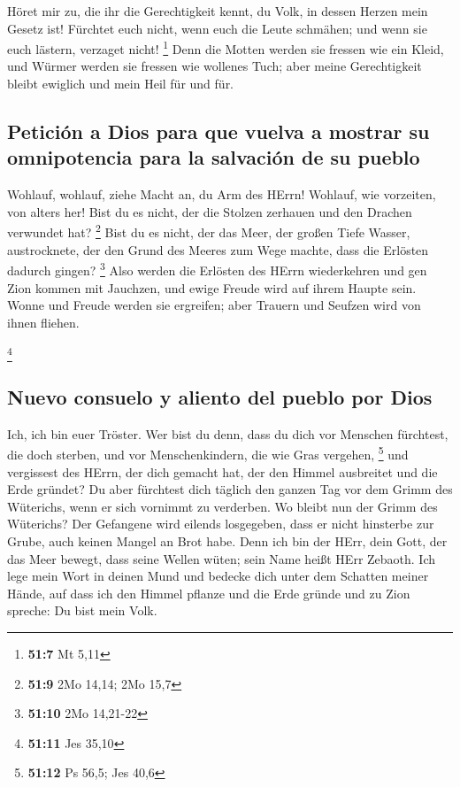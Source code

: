  Höret mir zu, die ihr die Gerechtigkeit kennt, du Volk,
in dessen Herzen mein Gesetz ist! Fürchtet euch nicht, wenn euch die
Leute schmähen; und wenn sie euch lästern, verzaget nicht! \footnote{\textbf{51:7}
  Mt 5,11}  Denn die Motten werden sie fressen wie ein
Kleid, und Würmer werden sie fressen wie wollenes Tuch; aber meine
Gerechtigkeit bleibt ewiglich und mein Heil für und für.

\hypertarget{peticiuxf3n-a-dios-para-que-vuelva-a-mostrar-su-omnipotencia-para-la-salvaciuxf3n-de-su-pueblo}{%
\subsection{Petición a Dios para que vuelva a mostrar su omnipotencia
para la salvación de su
pueblo}\label{peticiuxf3n-a-dios-para-que-vuelva-a-mostrar-su-omnipotencia-para-la-salvaciuxf3n-de-su-pueblo}}

 Wohlauf, wohlauf, ziehe Macht an, du Arm des HErrn!
Wohlauf, wie vorzeiten, von alters her! Bist du es nicht, der die
Stolzen zerhauen und den Drachen verwundet hat? \footnote{\textbf{51:9}
  2Mo 14,14; 2Mo 15,7}  Bist du es nicht, der das Meer,
der großen Tiefe Wasser, austrocknete, der den Grund des Meeres zum Wege
machte, dass die Erlösten dadurch gingen? \footnote{\textbf{51:10} 2Mo
  14,21-22}  Also werden die Erlösten des HErrn
wiederkehren und gen Zion kommen mit Jauchzen, und ewige Freude wird auf
ihrem Haupte sein. Wonne und Freude werden sie ergreifen; aber Trauern
und Seufzen wird von ihnen fliehen.

\footnote{\textbf{51:11} Jes 35,10}

\hypertarget{nuevo-consuelo-y-aliento-del-pueblo-por-dios}{%
\subsection{Nuevo consuelo y aliento del pueblo por
Dios}\label{nuevo-consuelo-y-aliento-del-pueblo-por-dios}}

 Ich, ich bin euer Tröster. Wer bist du denn, dass du
dich vor Menschen fürchtest, die doch sterben, und vor Menschenkindern,
die wie Gras vergehen, \footnote{\textbf{51:12} Ps 56,5; Jes 40,6}
 und vergissest des HErrn, der dich gemacht hat, der den
Himmel ausbreitet und die Erde gründet? Du aber fürchtest dich täglich
den ganzen Tag vor dem Grimm des Wüterichs, wenn er sich vornimmt zu
verderben. Wo bleibt nun der Grimm des Wüterichs?  Der
Gefangene wird eilends losgegeben, dass er nicht hinsterbe zur Grube,
auch keinen Mangel an Brot habe.  Denn ich bin der HErr,
dein Gott, der das Meer bewegt, dass seine Wellen wüten; sein Name heißt
HErr Zebaoth.  Ich lege mein Wort in deinen Mund und
bedecke dich unter dem Schatten meiner Hände, auf dass ich den Himmel
pflanze und die Erde gründe und zu Zion spreche: Du bist mein Volk.

